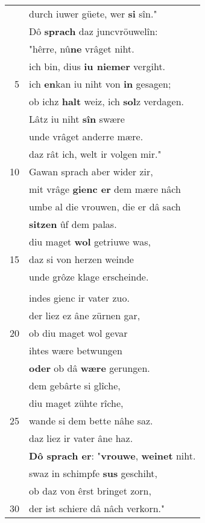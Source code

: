 \documentclass[8pt,a4paper,notitlepage]{article}
\begin{document}
\begin{table}[ht]
\begin{minipage}[t]{0.5\linewidth}
\begin{center}
\end{center}
\begin{tabular}{rl}
 & durch iuwer güete, wer \textbf{si} sîn."\\ 
 & Dô \textbf{sprach} daz juncvröuwelîn:\\ 
 & "hêrre, nû\textbf{ne} vrâget niht.\\ 
 & ich bin, dius \textbf{iu niemer} vergiht.\\ 
5 & ich \textbf{en}kan iu niht von \textbf{in} gesagen;\\ 
 & ob ichz \textbf{halt} weiz, ich \textbf{sol}z verdagen.\\ 
 & Lâtz iu niht \textbf{sîn} swære\\ 
 & unde vrâget anderre mære.\\ 
 & daz rât ich, welt ir volgen mir."\\ 
10 & Gawan sprach aber wider zir,\\ 
 & mit vrâge \textbf{gienc er} dem mære nâch\\ 
 & umbe al die vrouwen, die er dâ sach\\ 
 & \textbf{sitzen} ûf dem palas.\\ 
 & diu maget \textbf{wol} getriuwe was,\\ 
15 & daz si von herzen weinde\\ 
 & unde grôze klage erscheinde.\\ 
 & \textit{\begin{large}D\end{large}}annoch was ez harte vruo;\\ 
 & indes gienc ir vater zuo.\\ 
 & der liez ez âne zürnen gar,\\ 
20 & ob diu maget wol gevar\\ 
 & ihtes wære betwungen\\ 
 & \textbf{oder} ob dâ \textbf{wære} gerungen.\\ 
 & dem gebârte si glîche,\\ 
 & diu maget zühte rîche,\\ 
25 & wande si dem bette nâhe saz.\\ 
 & daz liez ir vater âne haz.\\ 
 & \textbf{Dô sprach er}: "\textbf{vrouwe}, \textbf{weinet} niht.\\ 
 & swaz in schimpfe \textbf{sus} geschiht,\\ 
 & ob daz von êrst bringet zorn,\\ 
30 & der ist schiere dâ nâch verkorn."\\ 

\end{tabular}
\end{minipage}
\end{table}
\end{document}
